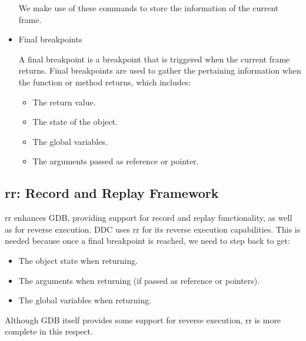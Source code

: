 \begin{itemize}
We make use of these commands to store the information of the current frame.
\item Final breakpoints

A final breakpoint is a breakpoint that is triggered when the current frame returns. Final breakpoints are used to gather the pertaining information when the function or method returns, which includes:
\begin{itemize}
    \item The return value.
    \item The state of the object.
    \item The global variables.
    \item The arguments passed as reference or pointer.
\end{itemize}
\end{itemize}
\subsection{rr: Record and Replay Framework}

rr \cite{rr} enhances GDB, providing support for record and replay functionality, as well as for reverse execution.
%
DDC uses rr for its reverse execution capabilities. This is needed because once a final breakpoint is reached, we need to step back to get:
\begin{itemize}
    \item The object state when returning.
    \item The arguments when returning (if passed as reference or pointers).
    \item The global variables when returning.
\end{itemize}
Although GDB itself provides some support for reverse execution, rr is more complete in this respect.
